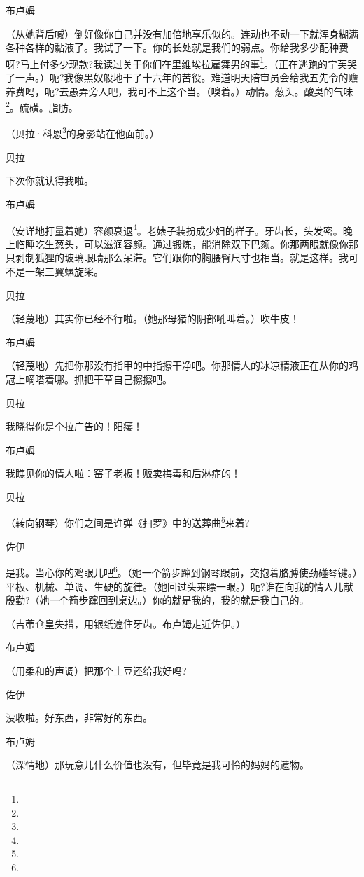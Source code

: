 \par 布卢姆
\par （从她背后喊）倒好像你自己并没有加倍地享乐似的。连动也不动一下就浑身糊满各种各样的黏液了。我试了一下。你的长处就是我们的弱点。你给我多少配种费呀?马上付多少现款?我读过关于你们在里维埃拉雇舞男的事\footnote{}。（正在逃跑的宁芙哭了一声。）呃?我像黑奴般地干了十六年的苦役。难道明天陪审员会给我五先令的赡养费吗，呃?去愚弄旁人吧，我可不上这个当。（嗅着。）动情。葱头。酸臭的气味\footnote{}。硫磺。脂肪。
\par （贝拉·科恩\footnote{}的身影站在他面前。）
\par 贝拉
\par 下次你就认得我啦。
\par 布卢姆
\par （安详地打量着她）容颜衰退\footnote{}。老婊子装扮成少妇的样子。牙齿长，头发密。晚上临睡吃生葱头，可以滋润容颜。通过锻炼，能消除双下巴颏。你那两眼就像你那只剥制狐狸的玻璃眼睛那么呆滞。它们跟你的胸腰臀尺寸也相当。就是这样。我可不是一架三翼螺旋桨。
\par 贝拉
\par （轻蔑地）其实你已经不行啦。（她那母猪的阴部吼叫着。）吹牛皮！
\par 布卢姆
\par （轻蔑地）先把你那没有指甲的中指擦干净吧。你那情人的冰凉精液正在从你的鸡冠上嘀嗒着哪。抓把干草自己擦擦吧。
\par 贝拉
\par 我晓得你是个拉广告的！阳痿！
\par 布卢姆
\par 我瞧见你的情人啦：窑子老板！贩卖梅毒和后淋症的！
\par 贝拉
\par （转向钢琴）你们之间是谁弹《扫罗》中的送葬曲\footnote{}来着?
\par 佐伊
\par 是我。当心你的鸡眼儿吧\footnote{}。（她一个箭步蹿到钢琴跟前，交抱着胳膊使劲碰琴键。）平板、机械、单调、生硬的旋律。（她回过头来瞟一眼。）呃?谁在向我的情人儿献殷勤?（她一个箭步蹿回到桌边。）你的就是我的，我的就是我自己的。
\par （吉蒂仓皇失措，用银纸遮住牙齿。布卢姆走近佐伊。）
\par 布卢姆
\par （用柔和的声调）把那个土豆还给我好吗?
\par 佐伊
\par 没收啦。好东西，非常好的东西。
\par 布卢姆
\par （深情地）那玩意儿什么价值也没有，但毕竟是我可怜的妈妈的遗物。
